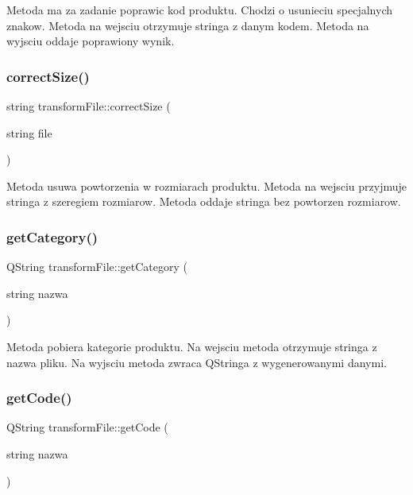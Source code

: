 Metoda ma za zadanie poprawic kod produktu. Chodzi o usunieciu specjalnych znakow. Metoda na wejsciu otrzymuje stringa z danym kodem. Metoda na wyjsciu oddaje poprawiony wynik. \mbox{\label{classtransform_file_a9f1b11361f9025107f1605c9d58387df}} 
\subsubsection{\texorpdfstring{correct\+Size()}{correctSize()}}
{\footnotesize\ttfamily string transform\+File\+::correct\+Size (\begin{DoxyParamCaption}\item[{string}]{file }\end{DoxyParamCaption})}

Metoda usuwa powtorzenia w rozmiarach produktu. Metoda na wejsciu przyjmuje stringa z szeregiem rozmiarow. Metoda oddaje stringa bez powtorzen rozmiarow. \mbox{\label{classtransform_file_ac5863226a17c784e7178bdc1607b0fcb}} 
\subsubsection{\texorpdfstring{get\+Category()}{getCategory()}}
{\footnotesize\ttfamily Q\+String transform\+File\+::get\+Category (\begin{DoxyParamCaption}\item[{string}]{nazwa }\end{DoxyParamCaption})}

Metoda pobiera kategorie produktu. Na wejsciu metoda otrzymuje stringa z nazwa pliku. Na wyjsciu metoda zwraca Q\+Stringa z wygenerowanymi danymi. \mbox{\label{classtransform_file_aa8019a9e13e288f647d85d829f6da6f0}} 
\subsubsection{\texorpdfstring{get\+Code()}{getCode()}}
{\footnotesize\ttfamily Q\+String transform\+File\+::get\+Code (\begin{DoxyParamCaption}\item[{string}]{nazwa }\end{DoxyParamCaption})}


